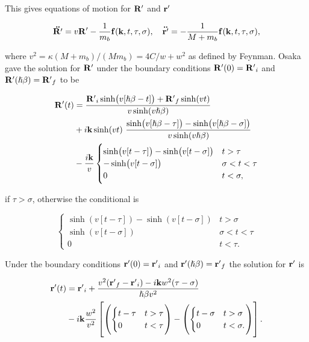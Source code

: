 This gives equations of motion for $\vb{R'}$ and $\vb{r'}$

\begin{equation}\label{eqn:osaka_rel}
    \vb{\ddot{R'}} = v\vb{R'} - \frac{1}{m_b} \vb{f}(\vb{k}, t, \tau, \sigma), \quad \vb{\ddot{r'}} = -\frac{1}{M+m_b} \vb{f}(\vb{k}, t, \tau, \sigma),
\end{equation}

where $v^2 = \kappa (M+m_b) / (M m_b) = 4C/w + w^2$ as defined by Feynman. Osaka gave the solution for $\vb{R'}$ under the boundary conditions $\vb{R'}(0) = \vb{R'}_i$ and $\vb{R'}(\hslash \beta) = \vb{R'}_f$ to be

\begin{equation}
    \begin{aligned}
    \vb{R'}(t) &= \frac{\vb{R'}_i \sinh (v[\hslash\beta - t]) + \vb{R'}_f \sinh(vt)}{v\sinh(v\hslash\beta)} \\
    &+ i\vb{k} \sinh(vt)\ \frac{\sinh(v[\hslash\beta - \tau]) - \sinh(v[\hslash\beta - \sigma])}{v\sinh(v\hslash\beta)} \\
    &- \frac{i\vb{k}}{v}
    \begin{cases}
        \sinh(v[t-\tau]) - \sinh(v[t-\sigma]) & t > \tau \\
        -\sinh(v[t-\sigma]) & \sigma < t < \tau \\
        0 & t < \sigma,
    \end{cases}
    \end{aligned}
\end{equation}

if $\tau > \sigma$, otherwise the conditional is

\begin{equation}
    \begin{cases}
        \sinh(v[t-\tau]) - \sinh(v[t-\sigma]) & t > \sigma \\
        \sinh(v[t-\sigma]) & \sigma < t < \tau \\
        0 & t < \tau.
    \end{cases}
\end{equation}

Under the boundary conditions $\vb{r'}(0) = \vb{r'}_i$ and $\vb{r'}(\hslash\beta) = \vb{r'}_f$ the solution for $\vb{r'}$ is

\begin{equation}
    \begin{aligned}
    \vb{r'}(t) &= \vb{r'}_i + \frac{v^2 (\vb{r'}_f - \vb{r'}_i) - i\vb{k}w^2 (\tau - \sigma)}{\hslash\beta v^2} \\
    &- i\vb{k}\frac{w^2}{v^2} \left[
    \left(\begin{cases}
        t - \tau & t > \tau \\
        0 & t < \tau
    \end{cases}\right) - 
    \left(\begin{cases}
        t - \sigma & t > \sigma \\
        0 & t < \sigma.
    \end{cases}\right)
    \right].
    \end{aligned}
\end{equation}

